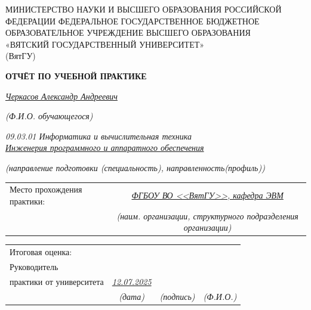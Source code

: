\documentclass[oneside,a4paper,14pt]{extarticle}
\begin{document}
\newpage
\thispagestyle{empty}
\begin{center}
    МИНИСТЕРСТВО НАУКИ И ВЫСШЕГО ОБРАЗОВАНИЯ РОССИЙСКОЙ ФЕДЕРАЦИИ ФЕДЕРАЛЬНОЕ ГОСУДАРСТВЕННОЕ БЮДЖЕТНОЕ ОБРАЗОВАТЕЛЬНОЕ УЧРЕЖДЕНИЕ ВЫСШЕГО ОБРАЗОВАНИЯ\\
    «ВЯТСКИЙ ГОСУДАРСТВЕННЫЙ УНИВЕРСИТЕТ»\\
    (ВятГУ)
\end{center}

\vspace{5mm}

\begin{center}
    \textbf{ОТЧЁТ ПО УЧЕБНОЙ ПРАКТИКЕ}
\end{center}

\vspace{1cm}

\begin{center}
  \uline{\hfill\textit{Черкасов Александр Андреевич}\hfill}
  \par
  \footnotesize \textit{(Ф.И.О. обучающегося)}
\end{center}
\begin{center}
	\textit{09.03.01 Информатика и вычислительная техника}\\
	\uline{\hfill\textit{Инженерия программного и аппаратного обеспечения}\hfill}
  \par
  \footnotesize \textit{(направление подготовки (специальность), направленность(профиль))}
\end{center}

\noindent
\begin{tabular}{lc}
	Место прохождения практики: & \uline{\hfill \textit{ФГБОУ ВО <<ВятГУ>>, кафедра ЭВМ} \hfill} \\
    & \footnotesize\textit{(наим. организации, структурного подразделения организации)}
\end{tabular}

\vspace{2cm}
\noindent
\begin{tabular}{lccc}
  \multicolumn{4}{l}{Итоговая оценка: \uline{\hfill}} \\
    Руководитель \\
  практики от университета & \uline{\hfill \textit{12.07.2025} \hfill} & \uline{\hspace{4cm}} & \uline{\hspace{4cm}} \\
    & \footnotesize\textit{(дата)} & \footnotesize\textit{(подпись)} & \footnotesize\textit{(Ф.И.О.)}
\end{tabular}
\end{document}
